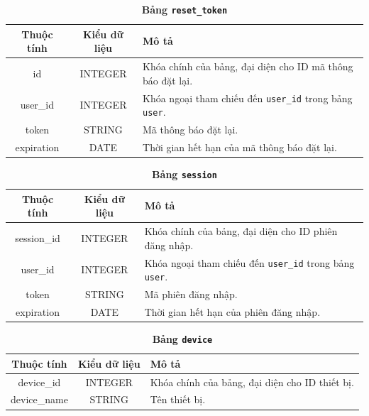 \begin{table}[H]
  \caption{\bfseries \fontsize{12pt}{0pt}\selectfont Bảng \texttt{reset\_token}}
  \centering
  \begin{tabularx}{0.9\textwidth}{|c|c|X|}
    \hline
    \textbf{Thuộc tính} & \textbf{Kiểu dữ liệu} & \textbf{Mô tả} \\
    \hline
    id & INTEGER & Khóa chính của bảng, đại diện cho ID mã thông báo đặt lại. \\
    \hline
    user\_id & INTEGER & Khóa ngoại tham chiếu đến \texttt{user\_id} trong bảng \texttt{user}. \\
    \hline
    token & STRING & Mã thông báo đặt lại. \\
    \hline
    expiration & DATE & Thời gian hết hạn của mã thông báo đặt lại. \\
    \hline
  \end{tabularx}
\end{table}


\begin{table}[H]
  \caption{\bfseries \fontsize{12pt}{0pt}\selectfont Bảng \texttt{session}}
  \centering
  \begin{tabularx}{0.9\textwidth}{|c|c|X|}
    \hline
    \textbf{Thuộc tính} & \textbf{Kiểu dữ liệu} & \textbf{Mô tả} \\
    \hline
    session\_id & INTEGER & Khóa chính của bảng, đại diện cho ID phiên đăng nhập. \\
    \hline
    user\_id & INTEGER & Khóa ngoại tham chiếu đến \texttt{user\_id} trong bảng \texttt{user}. \\
    \hline
    token & STRING & Mã phiên đăng nhập. \\
    \hline
    expiration & DATE & Thời gian hết hạn của phiên đăng nhập. \\
    \hline
  \end{tabularx}
\end{table}

\begin{table}[H]
  \caption{\bfseries \fontsize{12pt}{0pt}\selectfont Bảng \texttt{device}}
  \centering
  \begin{tabularx}{0.9\textwidth}{|c|c|X|}
    \hline
    \textbf{Thuộc tính} & \textbf{Kiểu dữ liệu} & \textbf{Mô tả} \\
    \hline
    device\_id & INTEGER & Khóa chính của bảng, đại diện cho ID thiết bị. \\
    \hline
    device\_name & STRING & Tên thiết bị. \\
    \hline
  \end{tabularx}
\end{table}

